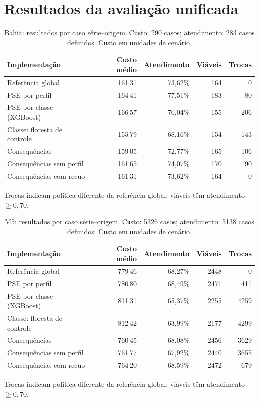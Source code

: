 \section{Resultados da avaliação unificada}
\label{sec:resultados_unificados}
\begin{table}[htbp]\centering\small
\caption{Bahia: resultados por caso série--origem. Custo: 290 casos; atendimento: 283 casos definidos. Custo em unidades de cenário.}
\label{tab:unificado_ba}
\begin{tabular}{@{}p{4.4cm}rrrr@{}}\toprule
Implementação & Custo médio & Atendimento & Viáveis & Trocas\\\midrule
Referência global & 161,31 & 73,62\% & 164 & 0\\
PSE por perfil & 164,41 & 77,51\% & 183 & 80\\
PSE por classe (XGBoost) & 166,57 & 70,04\% & 155 & 206\\
Classe: floresta de controle & 155,79 & 68,16\% & 154 & 143\\
Consequências & 159,05 & 72,77\% & 165 & 106\\
Consequências sem perfil & 161,65 & 74,07\% & 170 & 90\\
Consequências com recuo & 161,31 & 73,62\% & 164 & 0\\
\bottomrule\end{tabular}
\par\footnotesize Trocas indicam política diferente da referência global; viáveis têm atendimento $\geq0{,}70$.
\end{table}
\begin{table}[htbp]\centering\small
\caption{M5: resultados por caso série--origem. Custo: 5326 casos; atendimento: 5138 casos definidos. Custo em unidades de cenário.}
\label{tab:unificado_m5}
\begin{tabular}{@{}p{4.4cm}rrrr@{}}\toprule
Implementação & Custo médio & Atendimento & Viáveis & Trocas\\\midrule
Referência global & 779,46 & 68,27\% & 2448 & 0\\
PSE por perfil & 780,80 & 68,49\% & 2471 & 411\\
PSE por classe (XGBoost) & 811,31 & 65,37\% & 2255 & 4259\\
Classe: floresta de controle & 812,42 & 63,99\% & 2177 & 4299\\
Consequências & 760,45 & 68,08\% & 2456 & 3629\\
Consequências sem perfil & 761,77 & 67,92\% & 2440 & 3655\\
Consequências com recuo & 764,20 & 68,59\% & 2472 & 679\\
\bottomrule\end{tabular}
\par\footnotesize Trocas indicam política diferente da referência global; viáveis têm atendimento $\geq0{,}70$.
\end{table}
